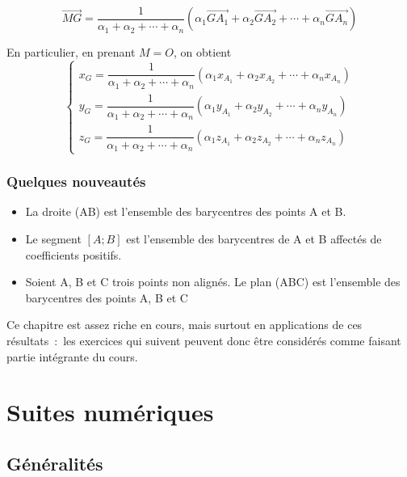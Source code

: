 \documentclass[french]{book}
\newcommand{\fr}[2]{\dfrac{#1}{#2}}
\newcommand{\ve}[1]{\overrightarrow{#1}}
\newcommand{\pa}[1]{(#1)}
\newcommand{\al}{\alpha}
\begin{document}
 \begin{thm}
   $$\ve{MG}=\fr{1}{\al_1+\al_2+\cdots+\al_n}\pa{\al_1\ve{GA_1}+\al_2\ve{GA_2}+\cdots+
\al_n\ve{GA_n}}$$
 \end{thm}


En particulier, en prenant $M=O$, on obtient 
$$\begin{cases}x_G=\fr{1}{\al_1+\al_2+\cdots+\al_n}\pa{\al_1 x_{A_1}+\al_2x_{A_2}+\cdots+\al_nx_{A_n}}\\
y_G=\fr{1}{\al_1+\al_2+\cdots+\al_n}\pa{\al_1 y_{A_1}+\al_2y_{A_2}+\cdots+\al_n y_{A_n}}\\
z_G=\fr{1}{\al_1+\al_2+\cdots+\al_n}\pa{\al_1 z_{A_1}+\al_2z_{A_2}+\cdots+\al_nz_{A_n}}
\end{cases}$$


\subsection{Quelques nouveautés}



\begin{thm}
  \begin{itemize}
  \item[$\bullet$]  La droite (AB) est l'ensemble des barycentres des points A et B.
\item[$\bullet$] Le segment $[A;B]$ est l'ensemble des barycentres de A et B affectés de coefficients positifs.
\item[$\bullet$] Soient A, B et C trois points non alignés. Le plan (ABC) est l'ensemble des barycentres des points A, B et C
  \end{itemize}
\end{thm}



Ce chapitre  est assez riche en  cours, mais surtout  en applications de
ces résultats~:~les  exercices qui suivent peuvent  donc être considérés
comme faisant partie intégrante du cours. 

\chapter{Suites numériques}

\section{Généralités}
\end{document}
